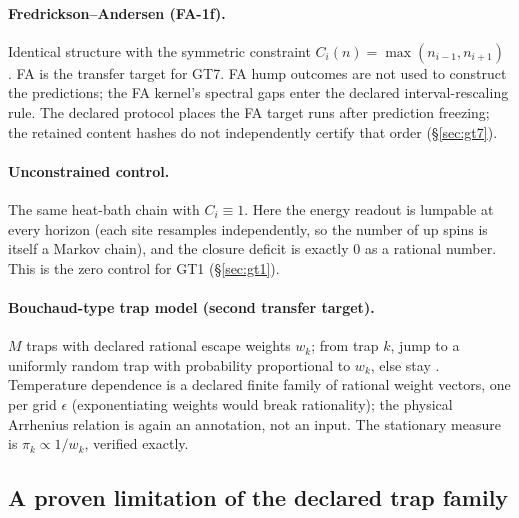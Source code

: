 \paragraph{Fredrickson--Andersen (FA-1f).} Identical structure with the symmetric constraint
$C_i(n) = \max(n_{i-1}, n_{i+1})$ \cite{fredrickson-andersen-1984}. FA is the transfer target for
GT7. FA hump outcomes are not used to construct the predictions; the FA kernel's spectral gaps
enter the declared interval-rescaling rule. The declared protocol places the FA target runs after
prediction freezing; the retained content hashes do not independently certify that order
(\S\ref{sec:gt7}).

\paragraph{Unconstrained control.} The same heat-bath chain with $C_i \equiv 1$. Here the energy
readout is lumpable at every horizon (each site resamples independently, so the number of up
spins is itself a Markov chain), and the closure deficit is exactly
$0$ as a rational number. This is the zero control for GT1 (\S\ref{sec:gt1}).

\paragraph{Bouchaud-type trap model (second transfer target).} $M$ traps with declared rational
escape weights $w_k$; from trap $k$, jump to a uniformly random trap with probability proportional
to $w_k$, else stay \cite{dyre-1987,bouchaud-1992,monthus-bouchaud-1996}. Temperature dependence is a
declared finite family of rational weight vectors, one per grid $\epsilon$ (exponentiating weights
would break rationality); the physical Arrhenius relation is again an annotation, not an input.
The stationary measure is $\pi_k \propto 1/w_k$, verified exactly.

\subsection{A proven limitation of the declared trap family}

